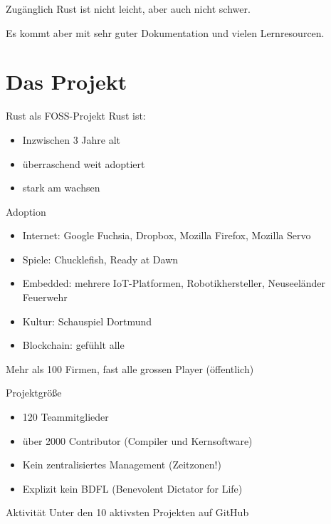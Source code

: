 \documentclass{beamer}
\begin{document}
\begin{frame}{Zugänglich}
	Rust ist nicht leicht, aber auch nicht schwer.

	Es kommt aber mit sehr guter Dokumentation und vielen Lernresourcen.
\end{frame}

\section{Das Projekt}

\begin{frame}{Rust als FOSS-Projekt}
	Rust ist:

	\begin{itemize}
		\item Inzwischen 3 Jahre alt
		\item überraschend weit adoptiert
		\item stark am wachsen
	\end{itemize}
\end{frame}

\begin{frame}{Adoption}

	\begin{itemize}
		\item Internet: Google Fuchsia, Dropbox, Mozilla Firefox, Mozilla Servo
		\item Spiele: Chucklefish, Ready at Dawn
		\item Embedded: mehrere IoT-Platformen, Robotikhersteller, Neuseeländer Feuerwehr
		\item Kultur: Schauspiel Dortmund
		\item Blockchain: gefühlt alle
	\end{itemize}

	Mehr als 100 Firmen, fast alle grossen Player (öffentlich)
\end{frame}

\begin{frame}{Projektgröße}
	\begin{itemize}
		\item 120 Teammitglieder
		\item über 2000 Contributor (Compiler und Kernsoftware)
		\item Kein zentralisiertes Management (Zeitzonen!)
		\item Explizit kein BDFL (Benevolent Dictator for Life)
	\end{itemize}
\end{frame}

\begin{frame}{Aktivität}
	Unter den 10 aktivsten Projekten auf GitHub
\end{frame}
\end{document}
